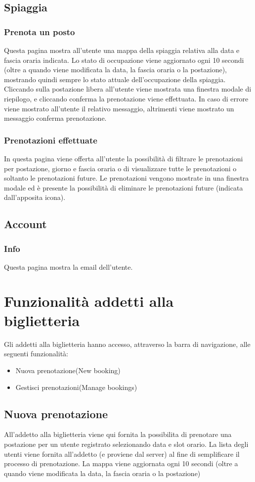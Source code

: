 \documentclass{article}
\begin{document}
\subsection{Spiaggia}
\subsubsection{Prenota un posto}
Questa pagina mostra all'utente una mappa della spiaggia relativa alla data e fascia oraria indicata. Lo stato di occupazione viene aggiornato ogni 10 secondi (oltre a quando viene modificata la data, la fascia oraria o la postazione), mostrando quindi sempre lo stato attuale dell'occupazione della spiaggia. Cliccando sulla postazione libera all'utente viene mostrata una finestra modale di riepilogo, e cliccando conferma la prenotazione viene effettuata. In caso di errore viene mostrato all'utente il relativo messaggio, altrimenti viene mostrato un messaggio conferma prenotazione.
\subsubsection{Prenotazioni effettuate} 
In questa pagina viene offerta all'utente la possibilità di filtrare le prenotazioni per postazione, giorno e fascia oraria o di visualizzare tutte le prenotazioni o soltanto le prenotazioni future.
Le prenotazioni vengono mostrate in una finestra modale ed è presente la possibilità di eliminare le prenotazioni future (indicata dall'apposita icona).
\subsection{Account}
\subsubsection{Info}
Questa pagina mostra la email dell'utente. 
\newpage
\section{Funzionalità addetti alla biglietteria}
Gli addetti alla biglietteria hanno accesso, attraverso la barra di navigazione, alle seguenti funzionalità:
\begin{itemize}
	\item Nuova prenotazione(New booking)
	\item Gestisci prenotazioni(Manage bookings)
\end{itemize}
\subsection{Nuova prenotazione}
All'addetto alla biglietteria viene qui fornita la possibilita di prenotare una postazione per un utente registrato selezionando data e slot orario. La lista degli utenti viene fornita all'addetto (e proviene dal server) al fine di semplificare il processo di prenotazione. La mappa viene aggiornata ogni 10 secondi (oltre a quando viene modificata la data, la fascia oraria o la postazione)
\end{document}
